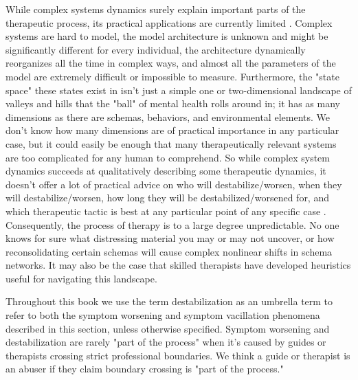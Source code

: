 \documentclass[12pt,letterpaper]{book}
\begin{document}
While complex systems dynamics surely explain important parts of the therapeutic process, its practical applications are currently limited \cite{hayes2020complex}. Complex systems are hard to model, the model architecture is unknown and might be significantly different for every individual, the architecture dynamically reorganizes all the time in complex ways, and almost all the parameters of the model are extremely difficult or impossible to measure. Furthermore, the "state space" these states exist in isn't just a simple one or two-dimensional landscape of valleys and hills that the "ball" of mental health rolls around in; it has as many dimensions as there are schemas, behaviors, and environmental elements. We don't know how many dimensions are of practical importance in any particular case, but it could easily be enough that many therapeutically relevant systems are too complicated for any human to comprehend. So while complex system dynamics succeeds at qualitatively describing some therapeutic dynamics, it doesn't offer a lot of practical advice on who will destabilize/worsen, when they will destabilize/worsen, how long they will be destabilized/worsened for, and which therapeutic tactic is best at any particular point of any specific case \cite{helmich2024slow,hayes2020complex}. Consequently, the process of therapy is to a large degree unpredictable. No one knows for sure what distressing material you may or may not uncover, or how reconsolidating certain schemas will cause complex nonlinear shifts in schema networks. It may also be the case that skilled therapists have developed heuristics useful for navigating this landscape.

Throughout this book we use the term destabilization as an umbrella term to refer to both the symptom worsening and symptom vacillation phenomena described in this section, unless otherwise specified. Symptom worsening and destabilization are rarely "part of the process" when it's caused by guides or therapists crossing strict professional boundaries. We think a guide or therapist is an abuser if they claim boundary crossing is "part of the process."


\end{document}
